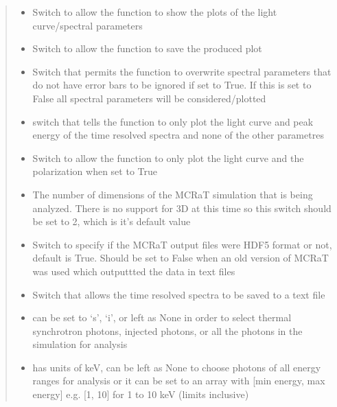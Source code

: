 \documentclass[letterpaper,10pt,english]{sphinxmanual}
\begin{document}
\begin{fulllineitems}
\begin{quote}
\begin{description}
\begin{itemize}
\item {} 
 \textendash{} Switch to allow the function to show the plots of the light curve/spectral parameters

\item {} 
 \textendash{} Switch to allow the function to save the produced plot

\item {} 
 \textendash{} Switch that permits the function to overwrite spectral parameters that do not have error bars
to be ignored if set to True. If this is set to False all spectral parameters will be considered/plotted

\item {} 
 \textendash{} switch that tells the function to only plot the light curve and peak energy of the time resolved
spectra and none of the other parametres

\item {} 
 \textendash{} Switch to allow the function to only plot the light curve and the polarization when set to True

\item {} 
 \textendash{} The number of dimensions of the MCRaT simulation that is being analyzed. There is no support for 3D at
this time so this switch should be set to 2, which is it’s default value

\item {} 
 \textendash{} Switch to specify if the MCRaT output files were HDF5 format or not, default is True. Should be set to
False when an old version of MCRaT was used which outputtted the data in text files

\item {} 
 \textendash{} Switch that allows the time resolved spectra to be saved to a text file

\item {} 
 \textendash{} can be set to ‘s’, ‘i’, or left as None in order to select thermal synchrotron photons, injected photons, or all the photons in the simulation for analysis

\item {} 
 \textendash{} has units of keV, can be left as None to choose photons of all energy ranges for analysis or it can be set to an array with {[}min energy, max energy{]} e.g. {[}1, 10{]} for 1 to 10 keV (limits inclusive)


\end{itemize}
\end{description}
\end{quote}
\end{fulllineitems}
\end{document}
